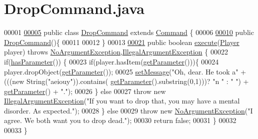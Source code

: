 \hypertarget{DropCommand_8java_source}{\section{Drop\-Command.\-java}
}

\begin{DoxyCode}
00001 
\hypertarget{DropCommand_8java_source_l00005}{}\hyperlink{classDropCommand}{00005} \textcolor{keyword}{public} \textcolor{keyword}{class }\hyperlink{classDropCommand}{DropCommand} \textcolor{keyword}{extends} \hyperlink{classCommand}{Command} \{
00006 
\hypertarget{DropCommand_8java_source_l00010}{}\hyperlink{classDropCommand_a98a8cc14e98c04bed31cd1580e5e3048}{00010}     \textcolor{keyword}{public} \hyperlink{classDropCommand_a98a8cc14e98c04bed31cd1580e5e3048}{DropCommand}()\{
00011 
00012     \}
00013 
\hypertarget{DropCommand_8java_source_l00021}{}\hyperlink{classDropCommand_a52432de0841ff8eb85d4f115965aecd1}{00021}     \textcolor{keyword}{public} \textcolor{keywordtype}{boolean} \hyperlink{classDropCommand_a52432de0841ff8eb85d4f115965aecd1}{execute}(\hyperlink{classPlayer}{Player} player) \textcolor{keywordflow}{throws} 
      \hyperlink{classNoArgumentException}{NoArgumentException},\hyperlink{classIllegalArgumentException}{IllegalArgumentException} \{
00022         \textcolor{keywordflow}{if}(\hyperlink{classCommand_a9b042558156d6749566e0fd9d48d3bfe}{hasParameter}()) \{
00023             \textcolor{keywordflow}{if}(player.hasItem(\hyperlink{classCommand_a1ced3739d546770ba1389e6ce228255e}{getParameter}()))\{
00024                 player.dropObject(\hyperlink{classCommand_a1ced3739d546770ba1389e6ce228255e}{getParameter}());
00025                 \hyperlink{classCommand_a715709d8f0ab65879d79ad1725c96f17}{setMessage}(\textcolor{stringliteral}{"Oh, dear. He took a"} + (((\textcolor{keyword}{new} String(\textcolor{stringliteral}{"aeiouy"})).contains(
      \hyperlink{classCommand_a1ced3739d546770ba1389e6ce228255e}{getParameter}().substring(0,1)))? \textcolor{stringliteral}{"n "} : \textcolor{stringliteral}{" "}) + \hyperlink{classCommand_a1ced3739d546770ba1389e6ce228255e}{getParameter}() + \textcolor{stringliteral}{"."});
00026             \} \textcolor{keywordflow}{else}
00027                 \textcolor{keywordflow}{throw} \textcolor{keyword}{new} \hyperlink{classIllegalArgumentException}{IllegalArgumentException}(\textcolor{stringliteral}{"If you want to drop that, you
       may have a mental disorder. As expected."});
00028         \} \textcolor{keywordflow}{else}
00029             \textcolor{keywordflow}{throw} \textcolor{keyword}{new} \hyperlink{classNoArgumentException}{NoArgumentException}(\textcolor{stringliteral}{"I agree. We both want you to drop dead."});
00030         \textcolor{keywordflow}{return} \textcolor{keyword}{false};
00031     \}
00032 
00033 \}
\end{DoxyCode}
